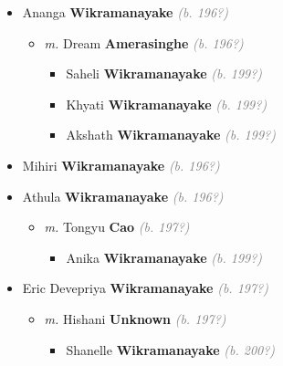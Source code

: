 \documentclass[10pt, openany]{book}
\begin{document}
\begin{itemize}
{\begin{itemize}
{\begin{itemize}
{\begin{itemize}
{\begin{itemize}
{\begin{itemize}
{\begin{itemize}
{\begin{itemize}
{ }
\item{Ariesha \textbf{Wikramanayake} \textcolor{gray}{\textit{(b. 199?)}}
 }
\end{itemize}}
\end{itemize}
  }
\item{Ananga \textbf{Wikramanayake} \textcolor{gray}{\textit{(b. 196?)}}
\begin{itemize}
\item{\textit{m.} Dream \textbf{Amerasinghe} \textcolor{gray}{\textit{(b. 196?)}}   \label{couple:00003915:00003916} \begin{itemize}
\item{Saheli \textbf{Wikramanayake} \textcolor{gray}{\textit{(b. 199?)}}
 }
\item{Khyati \textbf{Wikramanayake} \textcolor{gray}{\textit{(b. 199?)}}
 }
\item{Akshath \textbf{Wikramanayake} \textcolor{gray}{\textit{(b. 199?)}}
 }
\end{itemize}}
\end{itemize}
 }
\item{Mihiri \textbf{Wikramanayake} \textcolor{gray}{\textit{(b. 196?)}}
 }
\item{Athula \textbf{Wikramanayake} \textcolor{gray}{\textit{(b. 196?)}}
\begin{itemize}
\item{\textit{m.} Tongyu \textbf{Cao} \textcolor{gray}{\textit{(b. 197?)}}   \label{couple:00003921:00003922} \begin{itemize}
\item{Anika \textbf{Wikramanayake} \textcolor{gray}{\textit{(b. 199?)}}
 }
\end{itemize}}
\end{itemize}
 }
\item{Eric Devepriya \textbf{Wikramanayake} \textcolor{gray}{\textit{(b. 197?)}}
\begin{itemize}
\item{\textit{m.} Hishani \textbf{Unknown} \textcolor{gray}{\textit{(b. 197?)}}   \label{couple:00003924:00003925} \begin{itemize}
\item{Shanelle \textbf{Wikramanayake} \textcolor{gray}{\textit{(b. 200?)}}
}
\end{itemize}}
\end{itemize}}
\end{itemize}}
\end{itemize}}
\end{itemize}}
\end{itemize}}
\end{itemize}}
\end{itemize}
\end{document}
